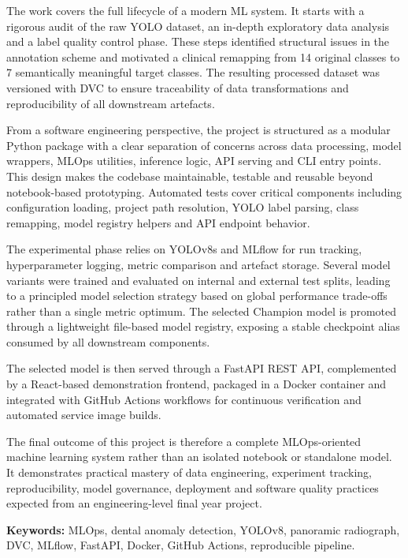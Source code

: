 \documentclass{rapportENSIAS}
\begin{document}
The work covers the full lifecycle of a modern ML system. It starts with a rigorous audit of the raw YOLO dataset, an in-depth exploratory data analysis and a label quality control phase. These steps identified structural issues in the annotation scheme and motivated a clinical remapping from 14 original classes to 7 semantically meaningful target classes. The resulting processed dataset was versioned with DVC to ensure traceability of data transformations and reproducibility of all downstream artefacts.

From a software engineering perspective, the project is structured as a modular Python package with a clear separation of concerns across data processing, model wrappers, MLOps utilities, inference logic, API serving and CLI entry points. This design makes the codebase maintainable, testable and reusable beyond notebook-based prototyping. Automated tests cover critical components including configuration loading, project path resolution, YOLO label parsing, class remapping, model registry helpers and API endpoint behavior.

The experimental phase relies on YOLOv8s and MLflow for run tracking, hyperparameter logging, metric comparison and artefact storage. Several model variants were trained and evaluated on internal and external test splits, leading to a principled model selection strategy based on global performance trade-offs rather than a single metric optimum. The selected Champion model is promoted through a lightweight file-based model registry, exposing a stable checkpoint alias consumed by all downstream components.

The selected model is then served through a FastAPI REST API, complemented by a React-based demonstration frontend, packaged in a Docker container and integrated with GitHub Actions workflows for continuous verification and automated service image builds.

The final outcome of this project is therefore a complete MLOps-oriented machine learning system rather than an isolated notebook or standalone model. It demonstrates practical mastery of data engineering, experiment tracking, reproducibility, model governance, deployment and software quality practices expected from an engineering-level final year project.

\textbf{Keywords:} MLOps, dental anomaly detection, YOLOv8, panoramic radiograph, DVC, MLflow, FastAPI, Docker, GitHub Actions, reproducible pipeline.

\newpage
\end{document}

